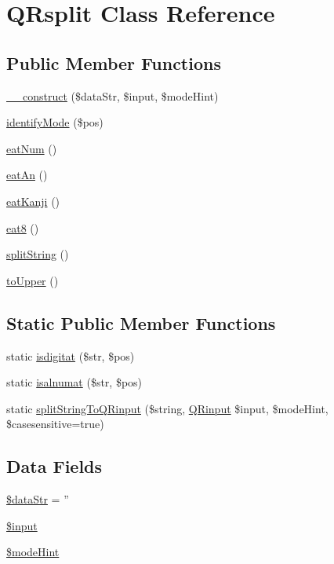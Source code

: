 \hypertarget{class_q_rsplit}{\section{Q\-Rsplit Class Reference}
\label{class_q_rsplit}
}
\subsection*{Public Member Functions}
\begin{DoxyCompactItemize}
\item 
\hyperlink{class_q_rsplit_ab6d391892bd4fca00b26c207c0c25028}{\-\_\-\-\_\-construct} (\$data\-Str, \$input, \$mode\-Hint)
\item 
\hyperlink{class_q_rsplit_a176539525b169d41f4c74dc6e661bf0a}{identify\-Mode} (\$pos)
\item 
\hyperlink{class_q_rsplit_aa49cfa79656346b732d7018a36ec16bb}{eat\-Num} ()
\item 
\hyperlink{class_q_rsplit_a591080d54cf193185c97b751b857ed0d}{eat\-An} ()
\item 
\hyperlink{class_q_rsplit_a62f6272831df97714c4340f53e4616c5}{eat\-Kanji} ()
\item 
\hyperlink{class_q_rsplit_a3d398ea754c792cbbe9262b722287ac2}{eat8} ()
\item 
\hyperlink{class_q_rsplit_a51fe7036da9e8ab3b89fe9e827ab2d7d}{split\-String} ()
\item 
\hyperlink{class_q_rsplit_a210414c5a350ea77864882229e46792d}{to\-Upper} ()
\end{DoxyCompactItemize}
\subsection*{Static Public Member Functions}
\begin{DoxyCompactItemize}
\item 
static \hyperlink{class_q_rsplit_a910d4316f738fe4abc618e763138325d}{isdigitat} (\$str, \$pos)
\item 
static \hyperlink{class_q_rsplit_a2f58528feced8fb32057c62e5dde4cb0}{isalnumat} (\$str, \$pos)
\item 
static \hyperlink{class_q_rsplit_a9d0848333ce26e36223c0f1942a60e86}{split\-String\-To\-Q\-Rinput} (\$string, \hyperlink{class_q_rinput}{Q\-Rinput} \$input, \$mode\-Hint, \$casesensitive=true)
\end{DoxyCompactItemize}
\subsection*{Data Fields}
\begin{DoxyCompactItemize}
\item 
\hyperlink{class_q_rsplit_a510330895e5b604700cba243196c4417}{\$data\-Str} = ''
\item 
\hyperlink{class_q_rsplit_a69b271260be394b90709736cccb22c76}{\$input}
\item 
\hyperlink{class_q_rsplit_a645029e81c17b7966c7f87dbacb84f13}{\$mode\-Hint}
\end{DoxyCompactItemize}


